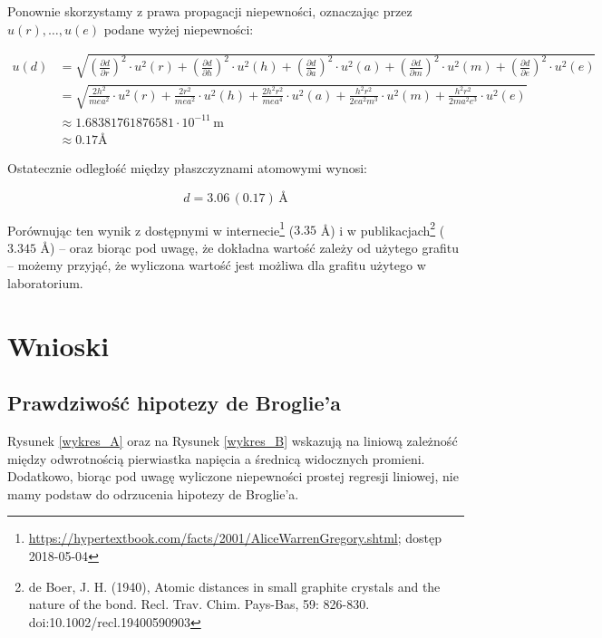 \documentclass[a4paper]{article}
\begin{document}
Ponownie skorzystamy z prawa propagacji niepewności, oznaczając przez $u(r), \dots, u(e)$ podane wyżej niepewności:

\begin{align*}
	u(d) &= \sqrt{
		\left( \frac{\partial d}{\partial r} \right)^2 \cdot u^2(r) +
		\left( \frac{\partial d}{\partial h} \right)^2 \cdot u^2(h) +
                \left( \frac{\partial d}{\partial a} \right)^2 \cdot u^2(a) +
                \left( \frac{\partial d}{\partial m} \right)^2 \cdot u^2(m) +
                \left( \frac{\partial d}{\partial e} \right)^2 \cdot u^2(e)
	} \\
	&= \sqrt{
		\frac{2h^2}{mea^2} \cdot u^2(r) +
		\frac{2r^2}{mea^2} \cdot u^2(h) +
		\frac{2h^2r^2}{mea^4} \cdot u^2(a) +
		\frac{h^2r^2}{2e a^2 m^3} \cdot u^2(m) +
		\frac{h^2r^2}{2m a^2 e^3} \cdot u^2(e)
	} \\
	&\approx 1.68381761876581 \cdot 10^{-11} \, \text{m} \\
	&\approx 0.17 \text{Å}
\end{align*}

Ostatecznie odległość między płaszczyznami atomowymi wynosi:

$$d = 3.06 \, (0.17) \, \text{Å}$$

Porównując ten wynik z dostępnymi w internecie\footnote{\url{https://hypertextbook.com/facts/2001/AliceWarrenGregory.shtml}; dostęp 2018-05-04}
($3.35$ Å)
i w publikacjach\footnote{de Boer, J. H. (1940), Atomic distances in small graphite crystals and the nature of the bond. Recl. Trav. Chim. Pays-Bas, 59: 826-830. doi:10.1002/recl.19400590903}
($3.345$ Å)
-- oraz biorąc pod uwagę, że dokładna wartość zależy od użytego grafitu --
możemy przyjąć, że wyliczona wartość jest możliwa dla grafitu użytego w laboratorium.

\section{Wnioski}

\subsection{Prawdziwość hipotezy de Broglie'a}

Rysunek \ref{wykres_A} oraz na Rysunek \ref{wykres_B} wskazują na liniową zależność między odwrotnością pierwiastka napięcia a średnicą widocznych promieni.
Dodatkowo, biorąc pod uwagę wyliczone niepewności prostej regresji liniowej, nie mamy podstaw do odrzucenia hipotezy de Broglie'a.
\end{document}
